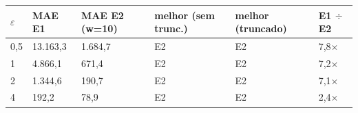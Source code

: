 \begin{tabular}{llllll}
\toprule
$\varepsilon$ & MAE E1 & MAE E2 (w=10) & melhor (sem trunc.) & melhor (truncado) & E1 $\div$ E2 \\
\midrule
0,5 & 13.163,3 & 1.684,7 & E2 & E2 & 7,8$\times$ \\
1 & 4.866,1 & 671,4 & E2 & E2 & 7,2$\times$ \\
2 & 1.344,6 & 190,7 & E2 & E2 & 7,1$\times$ \\
4 & 192,2 & 78,9 & E2 & E2 & 2,4$\times$ \\
\bottomrule
\end{tabular}

